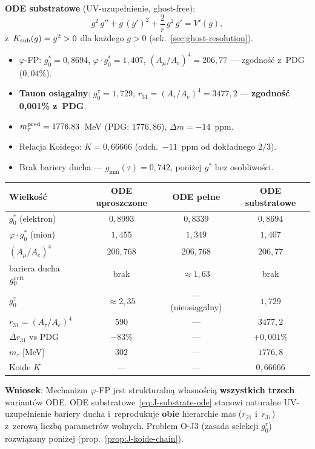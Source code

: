 \begin{remark}
\medskip\noindent
\textbf{ODE substratowe} (UV-uzupełnienie, ghost-free):
\begin{equation}\label{eq:J-substrate-ode}
  g^2\,g'' + g\,(g')^2 + \frac{2}{r}\,g^2\,g' = V'(g),
\end{equation}
z~$K_{\rm sub}(g) = g^2 > 0$ dla każdego $g > 0$ (sek.~\ref{sec:ghost-resolution}).
\begin{itemize}[nosep]
  \item $\varphi$-FP: $g_0^* = 0{,}8694$, $\varphi\cdot g_0^* = 1{,}407$,
    $(A_\mu/A_e)^4 = 206{,}77$ --- zgodność z~PDG ($0{,}04\%$).
  \item \textbf{Tauon osiągalny}: $g_0^\tau = 1{,}729$,
    $r_{31} = (A_\tau/A_e)^4 = 3477{,}2$ --- \textbf{zgodność 0{,}001\% z~PDG}.
  \item $m_\tau^{\rm pred} = 1776{,}83$~MeV (PDG: $1776{,}86$), $\Delta m = -14$~ppm.
  \item Relacja Koidego: $K = 0{,}66666$ (odch.\ $-11$~ppm od dokładnego $2/3$).
  \item Brak bariery ducha --- $g_{\min}(\tau) = 0{,}742$, poniżej $g^*$ bez osobliwości.
\end{itemize}

\medskip\noindent
\begin{tabular}{lccc}
\toprule
  Wielkość & ODE uproszczone & ODE pełne & ODE substratowe \\
\midrule
  $g_0^*$ (elektron) & $0{,}8993$ & $0{,}8339$ & $0{,}8694$ \\
  $\varphi\cdot g_0^*$ (mion) & $1{,}455$ & $1{,}349$ & $1{,}407$ \\
  $(A_\mu/A_e)^4$ & $206{,}768$ & $206{,}768$ & $206{,}77$ \\
  bariera ducha $g_0^{\rm crit}$ & brak & $\approx 1{,}63$ & brak \\
  $g_0^\tau$ & $\approx 2{,}35$ & --- (nieosiągalny) & $1{,}729$ \\
  $r_{31} = (A_\tau/A_e)^4$ & $590$ & --- & $3477{,}2$ \\
  $\Delta r_{31}$ vs PDG & $-83\%$ & --- & $+0{,}001\%$ \\
  $m_\tau$ [MeV] & $302$ & --- & $1776{,}8$ \\
  Koide $K$ & --- & --- & $0{,}66666$ \\
\bottomrule
\end{tabular}

\medskip\noindent
\textbf{Wniosek}: Mechanizm $\varphi$-FP jest strukturalną własnością
\textbf{wszystkich trzech} wariantów ODE.
ODE substratowe~\eqref{eq:J-substrate-ode} stanowi naturalne UV-uzupełnienie
bariery ducha i~reprodukuje \textbf{obie} hierarchie mas ($r_{21}$ i~$r_{31}$)
z~zerową liczbą parametrów wolnych.
Problem O-J3 (zasada selekcji $g_0^\tau$) rozwiązany poniżej
(prop.~\ref{prop:J-koide-chain}).
\end{remark}

